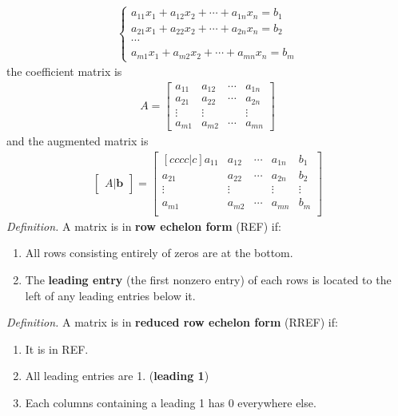 \begin{align*}
	\begin{cases}
	a_{11}x_1 + a_{12}x_2 + \cdots + a_{1n}x_n = b_1 \\
	a_{21}x_1 + a_{22}x_2 + \cdots + a_{2n}x_n = b_2 \\
	\cdots \\
	a_{m1}x_1 + a_{m2}x_2 + \cdots + a_{mn}x_n = b_m
	\end{cases}
\end{align*} the coefficient matrix is
\begin{align*}
A = \begin{bmatrix}
	a_{11} & a_{12} & \cdots & a_{1n} \\
	a_{21} & a_{22} & \cdots & a_{2n} \\
	\vdots & \vdots &        & \vdots \\
	a_{m1} & a_{m2} & \cdots & a_{mn}
\end{bmatrix}
\end{align*} and the augmented matrix is
\begin{align*}
	\begin{bmatrix}
		A | \textbf{b}
	\end{bmatrix} = \begin{bmatrix}[cccc|c]
		a_{11} & a_{12} & \cdots & a_{1n} & b_1 \\
		a_{21} & a_{22} & \cdots & a_{2n} & b_2 \\
		\vdots & \vdots &        & \vdots & \vdots \\
		a_{m1} & a_{m2} & \cdots & a_{mn} & b_m \\
	\end{bmatrix}
\end{align*}
\textit{Definition.} A matrix is in \textbf{row echelon form} (REF) if:
\begin{enumerate}
	\item All rows consisting entirely of zeros are at the bottom.
	\item The \textbf{leading entry} (the first nonzero entry) of each rows is located to the left of any leading entries below it.
\end{enumerate}
\textit{Definition.} A matrix is in \textbf{reduced row echelon form} (RREF) if:
\begin{enumerate}
	\item It is in REF.
	\item All leading entries are 1. (\textbf{leading 1})
	\item Each columns containing a leading 1 has 0 everywhere else.
\end{enumerate}

